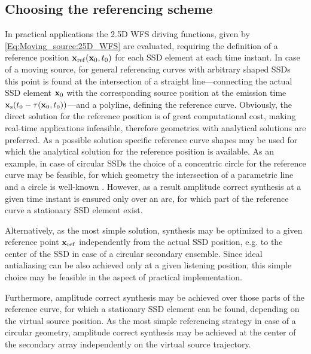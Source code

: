 \subsection{Choosing the referencing scheme}
In practical applications the 2.5D WFS driving functions, given by \eqref{Eq:Moving_source:25D_WFS} are evaluated, requiring the definition of a reference position $\mathbf{x}_{\mathrm{ref}}(\mathbf{x}_0,t_0)$ for each SSD element at each time instant.
In case of a moving source, for general referencing curves with arbitrary shaped SSDs this point is found at the intersection of a straight line---connecting the actual SSD element $\mathbf{x}_0$ with the corresponding source position at the emission time $\mathbf{x}_{\mathrm{s}}(t_0-\tau(\mathbf{x}_0,t_0))$---and a polyline, defining the reference curve. 
Obviously, the direct solution for the reference position is of great computational cost, making real-time applications infeasible, therefore geometries with analytical solutions are preferred.
As a possible solution specific reference curve shapes may be used for which the analytical solution for the reference position is available.
As an example, in case of circular SSDs the choice of a concentric circle for the reference curve may be feasible, for which geometry the intersection of a parametric line and a circle is well-known \cite[Ch.7.3.2]{Schneider2003:ComputerGraphics}.
However, as a result amplitude correct synthesis at a given time instant is ensured only over an arc, for which part of the reference curve a stationary SSD element exist.

Alternatively, as the most simple solution, synthesis may be optimized to a given reference point $\mathbf{x}_{\mathrm{ref}}$ independently from the actual SSD position, e.g. to the center of the SSD in case of a circular secondary ensemble.
Since ideal antialiasing can be also achieved only at a given listening position, this simple choice may be feasible in the aspect of practical implementation.

Furthermore, amplitude correct synthesis may be achieved over those parts of the reference curve, for which a stationary SSD element can be found, depending on the virtual source position.
As the most simple referencing strategy in case of a circular geometry, amplitude correct synthesis may be achieved at the center of the secondary array independently on the virtual source trajectory.


